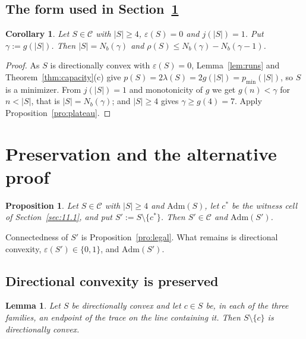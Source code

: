 \documentclass[11pt]{article}
\theoremstyle{plain}
\newtheorem{lemma}[theorem]{Lemma}
\newtheorem{proposition}[theorem]{Proposition}
\newtheorem{corollary}[theorem]{Corollary}
\theoremstyle{definition}
\theoremstyle{remark}
\newcommand{\sm}{\setminus}
\newcommand{\Adm}{\mathrm{Adm}}
\begin{document}
\subsection{The form used in Section~\ref{sec:preserve}}\label{sec:12.4}

\begin{corollary}\label{cor:plateau}
Let \(S\in\mathcal{C}\) with \(|S|\ge4\), \(\varepsilon(S)=0\) and \(j(|S|)=1\). Put
\(\gamma:=g(|S|)\). Then \(|S|=N_{b}(\gamma)\) and
\(\rho(S)\le N_{b}(\gamma)-N_{b}(\gamma-1)\).
\end{corollary}

\begin{proof}
As \(S\) is directionally convex with \(\varepsilon(S)=0\), Lemma~\ref{lem:runs} and
Theorem~\ref{thm:capacity}(c) give \(p(S)=2\lambda(S)=2g(|S|)=p_{\min}(|S|)\), so \(S\) is a
minimizer. From \(j(|S|)=1\) and monotonicity of \(g\) we get \(g(n)<\gamma\) for
\(n<|S|\), that is \(|S|=N_{b}(\gamma)\); and \(|S|\ge4\) gives \(\gamma\ge g(4)=7\). Apply
Proposition~\ref{pro:plateau}.
\end{proof}

\section{Preservation and the alternative proof}\label{sec:preserve}

\begin{proposition}\label{pro:preserve}
Let \(S\in\mathcal{C}\) with \(|S|\ge4\) and \(\Adm(S)\), let \(c^{*}\) be the witness cell
of Section~\ref{sec:11.1}, and put \(S':=S\sm\{c^{*}\}\). Then \(S'\in\mathcal{C}\) and
\(\Adm(S')\).
\end{proposition}

Connectedness of \(S'\) is Proposition~\ref{pro:legal}. What remains is directional
convexity, \(\varepsilon(S')\in\{0,1\}\), and \(\Adm(S')\).

\subsection{Directional convexity is preserved}\label{sec:13.1}

\begin{lemma}\label{lem:convpres}
Let \(S\) be directionally convex and let \(c\in S\) be, in each of the three families, an
endpoint of the trace on the line containing it. Then \(S\sm\{c\}\) is directionally convex.
\end{lemma}
\end{document}
